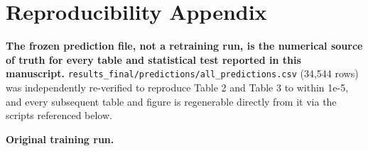\documentclass[a4paper,fleqn]{cas-sc}
\begin{document}
\printcredits

\clearpage
\appendix
\section{Reproducibility Appendix}
\label{sec:appendix:repro}

\textbf{The frozen prediction file, not a retraining run, is the numerical source of truth for every table and statistical test reported in this manuscript.} \texttt{results\_final/predictions/all\_predictions.csv} (34,544 rows) was independently re-verified to reproduce Table 2 and Table 3 to within 1e-5, and every subsequent table and figure is regenerable directly from it via the scripts referenced below.



\textbf{Original training run.}
\end{document}
